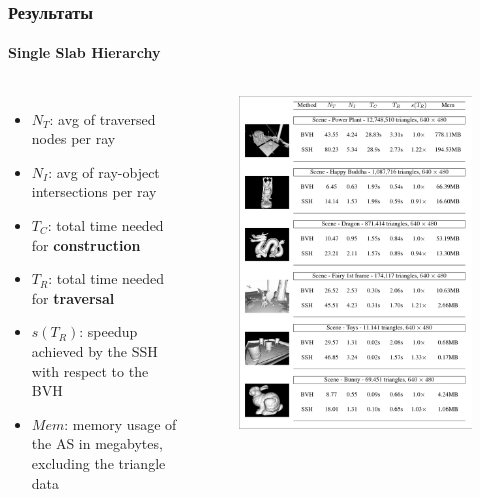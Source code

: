 \begin{frame}[t]
    \frametitle{Результаты}
    \framesubtitle{Single Slab Hierarchy}
    \begin{columns}
        \begin{itemize}
            \item
                $N_T$: avg of traversed nodes per ray
            \item
                $N_I$: avg of ray-object intersections per ray
            \item
                $T_C$: total time needed for \textbf{construction}
            \item
                $T_R$: total time needed for \textbf{traversal}
            \item
                $s(T_R)$: speedup achieved by the SSH with respect to the BVH
            \item
                $Mem$: memory usage of the AS in megabytes, excluding the triangle data
        \end{itemize}
        \begin{figure}
            \includegraphics[keepaspectratio, height=.75\textheight]{res/results_ssh.png}
        \end{figure}
    \end{columns}

\end{frame}

